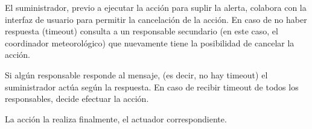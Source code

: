 El suministrador, previo a ejecutar la acción para suplir la alerta, colabora con la interfaz de usuario para permitir la cancelación de la acción. En caso de no haber respuesta (timeout) consulta a un responsable secundario (en este caso, el coordinador meteorológico) que nuevamente tiene la posibilidad de cancelar la acción.

Si algún responsable responde al mensaje, (es decir, no hay timeout) el suministrador actúa según la respuesta. En caso de recibir timeout de todos los responsables, decide efectuar la acción.

La acción la realiza finalmente, el actuador correspondiente.
